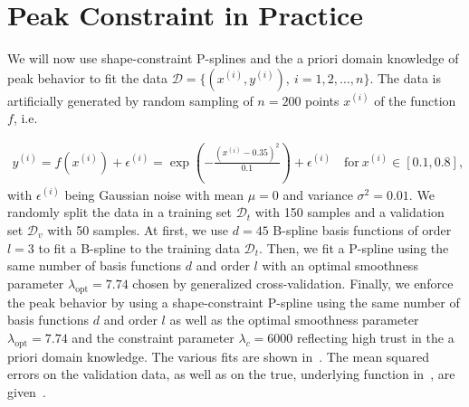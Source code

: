 \section{Peak Constraint in Practice} \label{sec:peak-behav-noisy}

We will now use shape-constraint P-splines and the a priori domain knowledge of peak behavior to fit the data $\mathcal{D} = \{(x^{(i)}, y^{(i)}), \ i=1,2,\dots,n\}$. The data is artificially generated by random sampling of $n=200$ points $x^{(i)}$ of the function $f$, i.e.

\begin{align} \label{eq:test-func-peak}
	y^{(i)} = f(x^{(i)}) + \epsilon^{(i)} = \exp\left(-\frac{(x^{(i)} - 0.35)^2}{0.1} \right) + \epsilon^{(i)} \quad \text{for} \ x^{(i)} \in [0.1,0.8],
\end{align}
%
with $\epsilon^{(i)}$ being Gaussian noise with mean $\mu = 0$ and variance $\sigma^2 = 0.01$. We randomly split the data in a training set $\mathcal{D}_t$ with 150 samples and a validation set $\mathcal{D}_v$ with 50 samples. At first, we use $d=45$ B-spline basis functions of order $l=3$ to fit a B-spline to the training data $\mathcal{D}_t$. Then, we fit a P-spline using the same number of basis functions $d$ and order $l$ with an optimal smoothness parameter $\lambda_{\mathrm{opt}} = 7.74$ chosen by generalized cross-validation. Finally, we enforce the peak behavior by using a shape-constraint P-spline using the same number of basis functions $d$ and order $l$ as well as the optimal smoothness parameter $\lambda_{\mathrm{opt}}=7.74$ and the constraint parameter $\lambda_c=6000$ reflecting high trust in the a priori domain knowledge. The various fits are shown in~. The mean squared errors on the validation data, as well as on the true, underlying function in~, are given~.



